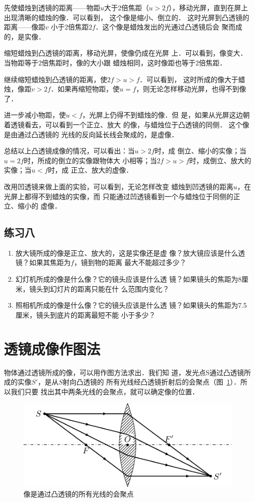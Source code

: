 先使蜡烛到透镜的距离——物距$u$大于2倍焦距（$u>
2f$），移动光屏，直到在屏上出现清晰的蜡烛的像．可以看到，
这个像是缩小、倒立的．
这时光屏到凸透镜的距离——像距$v$
小于2倍焦距$2f$．这个像是蜡烛发出的光通过凸透镜后会
聚而成的，是实像．

缩短蜡烛到凸透镜的距离，移动光屏，使像仍成在光屏
上．可以看到，像变大．当物距等于2倍焦距时，像的大小跟
蜡烛相同，这时像距也等于2倍焦距．

继续缩短蜡烛到凸透镜的距离，使$2f>u>f$．可以看到，
这时所成的像大于蜡烛，像距$v>2f$．如果再缩短物距，使$u=
f$，则无论怎样移动光屏，也得不到像了．

进一步减小物距，使$u<f$，光屏上仍得不到蜡烛的像．但
是，如果从光屏这边朝着透镜看去，可以看到一个正立、放大
的像，与蜡烛位于凸透镜的同侧．
这个像是由通过凸透镜的
光线的反向延长线会聚成的，是虚像．

总结以上凸透镜成像的情况，可以看出：当$u>2f$时，成
倒立、缩小的实像；当$u=2f$时，所成的倒立的实像跟物体大
小相等；当$2f>u>f$时，成倒立、放大的实像；当$u<f$时，成
正立、放大的虚像．

改用凹透镜来做上面的实验，可以看到，无论怎样改变
蜡烛到凹透镜的距离$u$，在光屏上都得不到蜡烛的实像，而
只能通过凹透镜看到一个与蜡烛位于同侧的正立、缩小的
虚像．

\subsection*{练习八}
\begin{enumerate}
    \item 放大镜所成的像是正立、放大的，这是实像还是虚
像？放大镜应该是什么透镜？如果其焦距为$f$，镜到物的距离
最大不能超过多少？
\item 幻灯机所成的像是什么像？它的镜头应该是什么透
镜？如果镜头的焦距为8厘米，镜头到幻灯片的距离只能在什
么范围内变化？
\item 照相机所成的像是什么像？它的镜头应该是什么透
镜？如果镜头的焦距为7.5厘米，镜头到底片的距离最短不能
小于多少？
\end{enumerate}

\section{透镜成像作图法}
物体通过透镜所成的像，可以用作图方法求出．我们知
道，发光点S通过凸透镜所成的实像$S'$，是从$S$射向凸透镜的
所有光线经凸透镜折射后的会聚点（图~\ref{fig_C_5-39}）．所以我们只要
找出其中两条光线的会聚点，就可以确定像的位置．
\begin{figure}[htbp]
    \centering
    \includegraphics{fig/C/5-39.pdf}
    \caption{像是通过凸透镜的所有光线的会聚点}\label{fig_C_5-39}
\end{figure}



